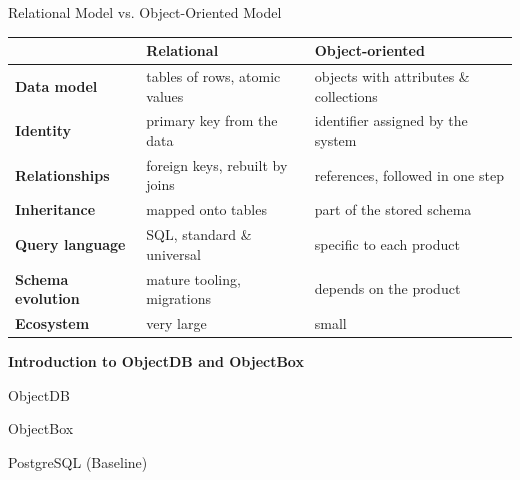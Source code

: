 \documentclass{beamer}
\begin{document}
\begin{frame}{Relational Model vs. Object-Oriented Model}
    \small
    \renewcommand{\arraystretch}{1.3}
    \begin{center}
        \begin{tabularx}{\textwidth}{|>{\bfseries}l|>{\raggedright\arraybackslash}X|>{\raggedright\arraybackslash}X|}
            \hline
            & \textbf{Relational} & \textbf{Object-oriented} \\
            \hline
            Data model       & tables of rows, atomic values  & objects with attributes \& collections \\
            \hline
            Identity         & primary key from the data      & identifier assigned by the system \\
            \hline
            Relationships    & foreign keys, rebuilt by joins & references, followed in one step \\
            \hline
            Inheritance      & mapped onto tables             & part of the stored schema \\
            \hline
            Query language   & SQL, standard \& universal     & specific to each product \\
            \hline
            Schema evolution & mature tooling, migrations     & depends on the product \\
            \hline
            Ecosystem        & very large                     & small \\
            \hline
        \end{tabularx}
    \end{center}
\end{frame}

\begin{frame}
    \vfill
    \begin{center}
        {\LARGE \textbf{Introduction to ObjectDB and ObjectBox}}\\[0.8em]
    \end{center}
    \vfill
\end{frame}

\begin{frame}{ObjectDB}
\end{frame}

\begin{frame}{ObjectBox}
\end{frame}

\begin{frame}{PostgreSQL (Baseline)}
\end{frame}
\end{document}
